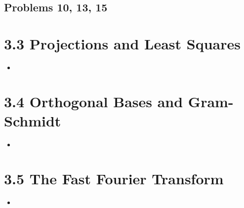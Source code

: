 \begin{itemize}
  \newpage
  \subsection{Problems 10, 13, 15}
  \begin{itemize}


  \end{itemize}

\end{itemize}

\section{3.3 Projections and Least Squares}
\begin{itemize}
  \item []

\end{itemize}

\section{3.4 Orthogonal Bases and Gram-Schmidt}
\begin{itemize}
  \item []

\end{itemize}

\section{3.5 The Fast Fourier Transform}
\begin{itemize}
  \item []

\end{itemize}
